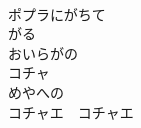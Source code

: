\documentclass[10pt,b5j]{tarticle} %
\begin{document}
\begin{enumerate}
\begin{minipage}[c]{\blocksize}
    \end{minipage}
    \begin{minipage}[c]{\blocksize}
        
        \vspace{\linespace}
        \item~\\
        ポプラにがちて\\
        がる\\
        おいらがの\\
        コチャ\\
        めやへの\\
        コチャエ　コチャエ
    
    \end{minipage}
\end{enumerate} %
\end{document}
